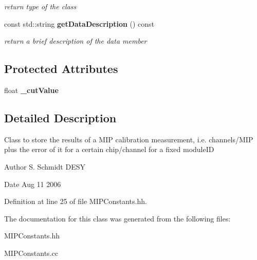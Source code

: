 \begin{DoxyCompactItemize}
\begin{DoxyCompactList}\small\item\em return type of the class \item\end{DoxyCompactList}\item 
const std::string {\bf getDataDescription} () const \label{classCALICE_1_1MIPConstants_a9019cd10f06227d6ef9b3b35262741cd}

\begin{DoxyCompactList}\small\item\em return a brief description of the data member \item\end{DoxyCompactList}\end{DoxyCompactItemize}
\subsection*{Protected Attributes}
\begin{DoxyCompactItemize}
\item 
float {\bfseries \_\-cutValue}\label{classCALICE_1_1MIPConstants_a80a22d8587d8511b6badaf9dd1107b0e}

\end{DoxyCompactItemize}


\subsection{Detailed Description}
Class to store the results of a MIP calibration measurement, i.e. channels/MIP plus the error of it for a certain chip/channel for a fixed moduleID \begin{DoxyAuthor}{Author}
S. Schmidt DESY 
\end{DoxyAuthor}
\begin{DoxyDate}{Date}
Aug 11 2006 
\end{DoxyDate}


Definition at line 25 of file MIPConstants.hh.

The documentation for this class was generated from the following files:\begin{DoxyCompactItemize}
\item 
MIPConstants.hh\item 
MIPConstants.cc\end{DoxyCompactItemize}
